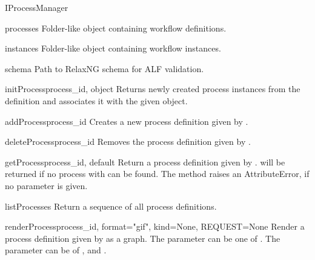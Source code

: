   \begin{classdesc}{IProcessManager}{}

    \begin{memberdesc}{processes}
        Folder-like object containing workflow definitions.
    \end{memberdesc}

    \begin{memberdesc}{instances}
        Folder-like object containing workflow instances.
    \end{memberdesc}

    \begin{memberdesc}{schema}
        Path to RelaxNG schema for ALF validation.
    \end{memberdesc}

    \begin{funcdesc}{initProcess}{process_id, object}
        Returns newly created process instances from the definition
         and associates it with the given object.
    \end{funcdesc}

    \begin{funcdesc}{addProcess}{process_id}
        Creates a new process definition given by .
    \end{funcdesc}

    \begin{funcdesc}{deleteProcess}{process_id}
        Removes the process definition given by .
    \end{funcdesc}

    \begin{funcdesc}{getProcess}{process_id, default}
        Return a process definition given by . 
         will be returned if no process with 
         can be found. The method raises an 
        AttributeError, if no  parameter 
        is given.
    \end{funcdesc}

    \begin{funcdesc}{listProcesses}{}
        Return a sequence of all process definitions.
    \end{funcdesc}

    \begin{funcdesc}{renderProcess}{process_id, format="gif", kind=None, REQUEST=None}
        Render a process definition given by  as a 
        graph. The  parameter can be one of . The  parameter can be of , 
         and . 
    \end{funcdesc}


\end{classdesc}
